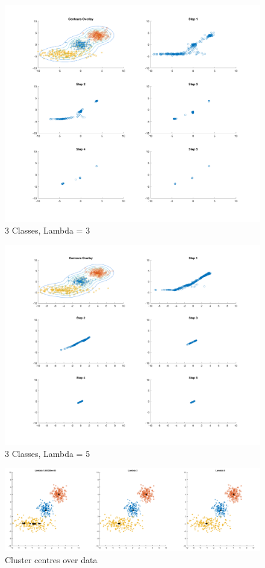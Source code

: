 \begin{figure}[H]
    \includegraphics[width=\linewidth]{../../pracs/week5/images/q3_3class_3}
    \centering
    \caption{3 Classes, Lambda = 3}
\end{figure}

\begin{figure}[H]
    \includegraphics[width=\linewidth]{../../pracs/week5/images/q3_3class_5}
    \centering
    \caption{3 Classes, Lambda = 5}
\end{figure}

\begin{figure}[H]
    \includegraphics[width=\linewidth]{../../pracs/week5/images/q3_3class_means}
    \centering
    \caption{Cluster centres over data}
\end{figure}

